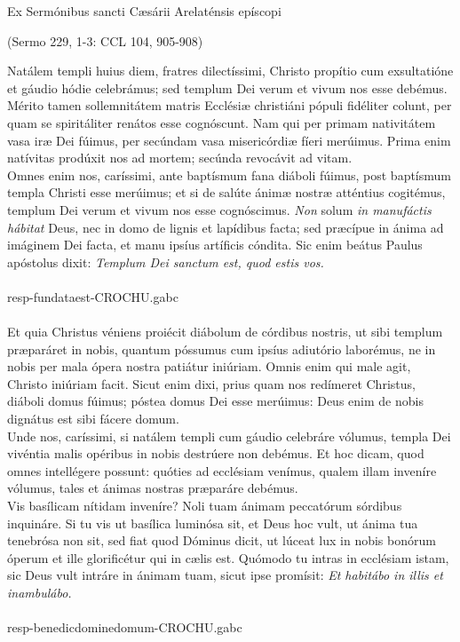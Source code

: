 \documentclass[options]{article}
\begin{document}
  Ex Sermónibus sancti Cæsárii Arelaténsis epíscopi 
  \begin{flushright}
  	  (Sermo 229, 1-3: CCL 104, 905-908)
    \end{flushright}
  	  Natálem templi huius diem, fratres dilectíssimi, Christo propítio cum exsultatióne et gáudio hódie celebrámus; sed templum Dei verum et vivum nos esse debémus. Mérito tamen sollemnitátem matris Ecclésiæ christiáni pópuli fidéliter colunt, per quam se spiritáliter renátos esse cognóscunt. Nam qui per primam nativitátem vasa iræ Dei fúimus, per secúndam vasa misericórdiæ fíeri merúimus. Prima enim natívitas prodúxit nos ad mortem; secúnda revocávit ad vitam.\\
  	   Omnes enim nos, caríssimi, ante baptísmum fana diáboli fúimus, post baptísmum templa Christi esse merúimus; et si de salúte ánimæ nostræ atténtius cogitémus, templum Dei verum et vivum nos esse cognóscimus. 
  	   \emph{Non} solum \emph{in manufáctis hábitat} Deus, nec in domo de lignis et lapídibus facta; sed præcípue in ánima ad imáginem Dei facta, et manu ipsíus artíficis cóndita. Sic enim beátus Paulus apóstolus dixit: \emph{Templum Dei sanctum est, quod estis vos.}\\
  	   \\
  	   resp-fundataest-CROCHU.gabc\\
  	   \\
  	   Et quia Christus véniens proiécit diábolum de córdibus nostris, ut sibi templum præparáret in nobis, quantum póssumus cum ipsíus adiutório laborémus, ne in nobis per mala ópera nostra patiátur iniúriam. Omnis enim qui male agit, Christo iniúriam facit. Sicut enim dixi, prius quam nos redímeret Christus, diáboli domus fúimus; póstea domus Dei esse merúimus: Deus enim de nobis dignátus est sibi fácere domum.\\
  	   Unde nos, caríssimi, si natálem templi cum gáudio celebráre vólumus, templa Dei vivéntia malis opéribus in nobis destrúere non debémus. Et hoc dicam, quod omnes intellégere possunt: quóties ad ecclésiam venímus, qualem illam inveníre vólumus, tales et ánimas nostras præparáre debémus.\\
  	     Vis basílicam nítidam inveníre? Noli tuam ánimam peccatórum sórdibus inquináre. Si tu vis ut basílica luminósa sit, et Deus hoc vult, ut ánima tua tenebrósa non sit, sed fiat quod Dóminus dicit, ut lúceat lux in nobis bonórum óperum et ille glorificétur qui in cælis est. Quómodo tu intras in ecclésiam istam, sic Deus vult intráre in ánimam tuam, sicut ipse promísit: \emph{Et habitábo in illis et inambulábo.}\\
  	     \\
  	     resp-benedicdominedomum-CROCHU.gabc 
  	     
  	      
\end{document}
